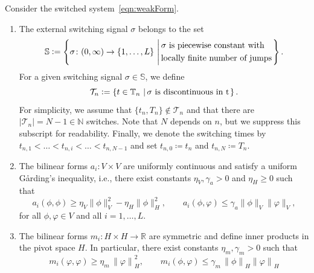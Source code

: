 \documentclass[reqno]{amsart}
\newcommand{\R}{\mathbb R}
\newcommand{\N}{\mathbb N}
\newcommand{\timeInt}{\mathbb{T}}
\newcommand{\coerAV}{\eta_V}
\newcommand{\coerAH}{\eta_H}
\newcommand{\contA}{\gamma_a}
\newcommand{\coerM}{\eta_m}
\newcommand{\contM}{\gamma_m}
\newcommand{\switch}{\sigma}
\newcommand{\nrModes}{L}
\newcommand{\addSwitching}{\mathbb{S}}
\newcommand{\nrSwitches}{N}
\newcommand{\calT}{\mathcal{T}}
\begin{document}
\begin{assumption}
	\label{ass:switchedSystem}
	Consider the switched system~\eqref{eqn:weakForm}.
	\begin{enumerate}
		\item\label{ass:switchedSystem:switching} The external switching signal $\switch$ belongs to the set
			\begin{align*}
				\addSwitching \vcentcolon= \left\{\switch\colon (0,\infty)\to \{1,\ldots,\nrModes\} \,\left|\,\begin{aligned}&\switch \text{ is piecewise constant with}\\
				 &\text{locally finite number of jumps}\end{aligned}\right.\right\}.
			\end{align*}
            For a given switching signal $\switch\in\addSwitching$, we define
   \begin{equation}\label{eqn:swi:tim}
				\calT_n \vcentcolon= \left\{t\in \timeInt_n \,\left|\,\switch \text{ is discontinuous in t} \right.\right\}.
    \end{equation}
    For simplicity, we assume that $\{t_n,T_n\}\notin \calT_n$ and that there are $|\calT_n| = \nrSwitches-1\in \N$ switches. Note that $N$ depends on $n$, but we suppress this subscript for readability. Finally, we denote the switching times by $t_{n,1}<\ldots<t_{n,i}<\ldots<t_{n,\nrSwitches-1}$ and set $t_{n,0}\coloneqq t_n$ and $t_{n,N}\coloneqq T_n$.
 		\item\label{ass:switchedSystem:A} The bilinear forms $a_i\colon V\times V$ are uniformly continuous and satisfy a uniform G\r{a}rding's inequality, i.e., there exist constants $\coerAV,\contA>0$ and $\coerAH\geq 0$ such that
        	\begin{equation}
        		\label{eqn:properties:a}
        		a_i(\phi,\phi)\geq \coerAV\|\phi\|_V^2 - \coerAH\|\phi\|_H^2,\qquad
        		a_i(\phi,\varphi) \leq \contA \|\phi\|_V\|\varphi\|_V,
       		 \end{equation}
       		 for all $\phi,\varphi\in V$ and all $i=1,\ldots,\nrModes$.
		\item\label{ass:switchedSystem:M} The bilinear forms $m_i\colon H\times H\to \R$ are symmetric and define inner products in the pivot space $H$. In particular, there exist constants $\coerM,\contM>0$ such that 
			\begin{equation}\nonumber
				m_i(\varphi,\varphi)\geq \coerM\,{\|\varphi\|}_H^2,\qquad
				m_i(\phi,\varphi) \leq \contM\,{\|\phi\|}_H {\|\varphi\|}_H

\end{equation}
\end{enumerate}
\end{assumption}
\end{document}
